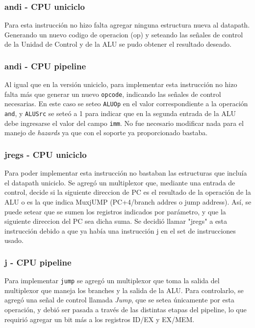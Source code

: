 \documentclass[a4paper, 12pt]{article}
\begin{document}
	\subsubsection{andi - CPU uniciclo}
	Para esta instrucción no hizo falta agregar ninguna estructura nueva al datapath. Generando un nuevo codigo de operacion (op) y seteando las señales de control de la Unidad de Control y de la ALU  se pudo obtener el resultado deseado.
	
	\subsubsection{andi - CPU pipeline}
	Al igual que en la versión uniciclo, para implementar esta instrucción no hizo falta más que generar un nuevo \texttt{opcode}, indicando las señales de control necesarias. En este caso se seteo \texttt{ALUOp} en el valor correspondiente a la operación \texttt{and}, y \texttt{ALUSrc} se seteó a 1 para indicar que en la segunda entrada de la ALU debe ingresarse el valor del campo \texttt{imm}. 
	No fue necesario modificar nada para el manejo de \textit{hazards} ya que con el soporte ya proporcionado bastaba.
	 
	\subsubsection{jregs - CPU uniciclo}
	Para poder implementar esta instrucción no bastaban las estructuras que incluía el datapath uniciclo.
	Se agregó un multiplexor que, mediante una entrada de control, decide si la siguiente direccion de PC es el resultado de la operación de la ALU o es la que indica MuxjUMP (PC+4/branch addres o jump address). Así, se puede setear que se sumen los registros indicados por parámetro, y que la siguiente direccion del PC sea dicha suma.
	Se decidió llamar "jregs" a esta instrucción debido a que ya había una instrucción j en el set de instrucciones usado.
	\subsubsection{j - CPU pipeline}
	Para implementar \texttt{jump} se agregó un multiplexor que toma la salida del multiplexor que maneja los branches y la salida de la ALU. Para controlarlo, se agregó una señal de control llamada \textit{Jump}, que se setea únicamente por esta operación, y debió ser pasada a través de las distintas etapas del pipeline, lo que requirió agregar un bit más a los registros ID/EX y EX/MEM.
	
\end{document}
